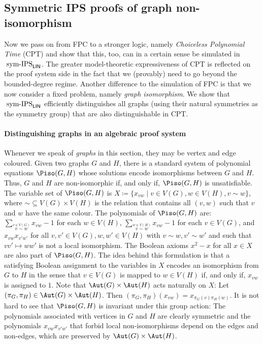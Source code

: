 \documentclass[a4paper,UKenglish,cleveref, autoref, thm-restate]{lipics-v2021}
\newcommand{\symIPSlin}{\text{ \upshape sym-IPS}_{\mathsf{LIN}}}
\begin{document}
\subsection{Symmetric IPS proofs of graph non-isomorphism}
Now we pass on from FPC to a stronger logic, namely \emph{Choiceless Polynomial Time} (CPT) and show that this, too, can in a certain sense be simulated in$\symIPSlin{}$. The greater model-theoretic expressiveness of CPT is reflected on the proof system side in the fact that we (provably) need to go beyond the bounded-degree regime. 
Another difference to the simulation of FPC is that we now consider a fixed problem, namely
\emph{graph isomorphism}. We show that$\symIPSlin{}$ efficiently distinguishes all graphs (using their natural symmetries as the symmetry group) that are also distinguishable in CPT. %

\paragraph*{Distinguishing graphs in an algebraic proof system} 
Whenever we speak of \emph{graphs} in this section, they may be vertex and edge coloured. 
Given two graphs $G$ and $H$, there is a standard system of polynomial equations $\Piso(G,H)$ \cite{GI, Pago} whose solutions encode isomorphisms between $G$ and $H$. Thus, $G$ and $H$ are non-isomorphic if, and only if, $\Piso(G,H)$ is unsatisfiable.
The variable set of $\Piso(G,H)$ is $X \coloneqq \{x_{vw} \mid v \in V(G), w \in V(H), v \sim w\}$, where $\sim \subseteq V(G) \times V(H)$ is the relation that contains all $(v,w)$ such that $v$ and $w$ have the same colour.
The polynomials of $\Piso(G,H)$ are: $\sum_{\stackrel{v \in V(G)}{v \sim w}} x_{vw} - 1$ for each $w \in V(H)$, $\sum_{\stackrel{w \in V(H)}{v \sim w}} x_{vw} - 1 $ for each $v \in V(G)$, and $x_{vw}x_{v'w'}$ for all $v,v' \in V(G), w,w' \in V(H)$ with $v \sim w, v' \sim w'$ and such that $vv' \mapsto ww'$ is not a local isomorphism.
The Boolean axioms $x^2 - x$ for all $x \in X$ are also part of $\Piso(G,H)$. The idea behind this formulation is that a satisfying Boolean assignment to the variables in $X$ encodes an isomorphism from $G$ to $H$ in the sense that $v \in V(G)$ is mapped to $w \in V(H)$ if, and only if, $x_{vw}$ is assigned to $1$.
Note that $\Aut(G) \times \Aut(H)$ acts naturally on $X$: Let $(\pi_G, \pi_H) \in \Aut(G) \times \Aut(H)$. Then $(\pi_G, \pi_H)(x_{vw}) = x_{\pi_G(v)\pi_H(w)}$. It is not hard to see that $\Piso(G,H)$ is invariant under this group action: The polynomials associated with vertices in $G$ and $H$ are clearly symmetric and the polynomials $x_{vw}x_{v'w'}$ that forbid local non-isomorphisms depend on the edges and non-edges, which are preserved by $\Aut(G) \times \Aut(H)$.
\end{document}
